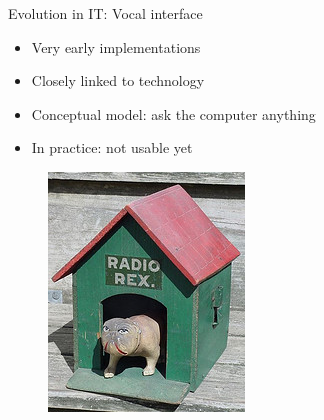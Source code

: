 \documentclass{beamer}
\begin{document}
\begin{frame}{Evolution in IT: Vocal interface}
\begin{itemize}
\item Very early implementations
\item Closely linked to technology
\item Conceptual model: ask the computer anything
\item In practice: not usable yet
\end{itemize}
\begin{figure}[ht]
\begin{minipage}[b]{0.30\linewidth}
\centering
\includegraphics[width=\textwidth]{radio-rex.jpg}



\end{minipage}
\end{figure}
\end{frame}
\end{document}
